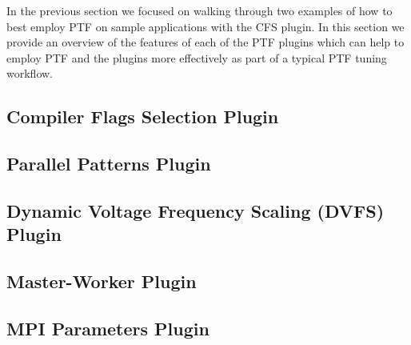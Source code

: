 In the previous section we focused on walking through two examples of how to best employ PTF on sample applications with the CFS plugin. In this section we provide an overview of the features of each of the PTF plugins which can help to employ PTF and the plugins more effectively as part of a typical PTF tuning workflow.


\subsection{Compiler Flags Selection Plugin}

\clearpage

\subsection{Parallel Patterns Plugin}

\clearpage


\subsection{Dynamic Voltage Frequency Scaling (DVFS) Plugin}

\clearpage

\subsection{Master-Worker Plugin}

\clearpage

\subsection{MPI Parameters Plugin}

\clearpage

